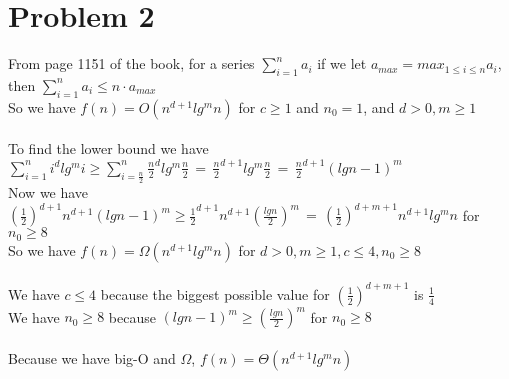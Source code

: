\documentclass{article}
\begin{document}
\section*{Problem 2}
From page 1151 of the book, for a series $\sum_{i=1}^na_i$ if we let $a_{max}=max_{1\leq i \leq n}a_i$, then $\sum_{i=1}^na_i \leq n \cdot a_{max}$\\
So we have $f(n)=O(n^{d+1}lg^mn)$ for $c\geq 1$ and $n_0=1$, and $d > 0, m\geq 1$\\\\
To find the lower bound we have $\sum_{i=1}^ni^dlg^mi \geq \sum_{i=\frac{n}{2}}^n\frac{n}{2}^dlg^m\frac{n}{2}\,=\,\frac{n}{2}^{d+1}lg^m\frac{n}{2}\,=\,\frac{n}{2}^{d+1}(lgn-1)^m$\\
Now we have $(\frac{1}{2})^{d+1}n^{d+1}(lgn-1)^m \geq \frac{1}{2}^{d+1}n^{d+1}(\frac{lgn}{2})^m\,=\,(\frac{1}{2})^{d+m+1}n^{d+1}lg^mn$ for $n_0\geq 8$\\
So we have $f(n)=\Omega(n^{d+1}lg^mn)$ for $d > 0, m\geq 1, c\leq 4, n_0 \geq 8$\\\\
We have $c\leq 4$ because the biggest possible value for $(\frac{1}{2})^{d+m+1}$ is $\frac{1}{4}$\\
We have $n_0 \geq 8$ because $(lgn-1)^m\geq (\frac{lgn}{2})^m$ for $n_0 \geq 8$\\\\
Because we have big-O and $\Omega$, $f(n)=\Theta(n^{d+1}lg^mn)$\\
\end{document}
